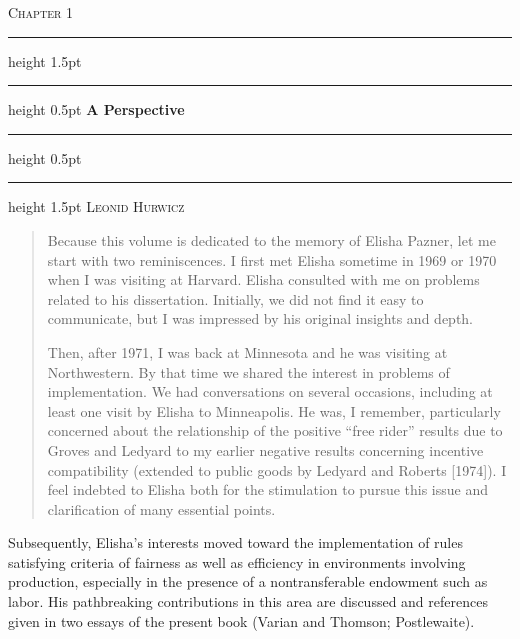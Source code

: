 \documentclass[12pt]{article}
\newenvironment{reminiscence}{%
    \itshape\color{black!80}%
    \begin{quote}%
}{%
    \end{quote}%
}
\begin{document}

\begin{center}
    \vspace*{1cm}
    {\color{SlateGray}\textsc{Chapter 1}} \\
    \vspace{0.4cm}
    \hrule height 1.5pt
    \vspace{0.2cm}
    \hrule height 0.5pt
    \vspace{0.6cm}
    {\huge\bfseries\color{MidnightBlue} A Perspective} \\
    \vspace{0.6cm}
    \hrule height 0.5pt
    \vspace{0.2cm}
    \hrule height 1.5pt
    \vspace{0.8cm}
    {\Large\scshape Leonid Hurwicz} \\
    \vspace{1.5cm}
\end{center}

\begin{reminiscence}
Because this volume is dedicated to the memory of Elisha Pazner, let me start with two reminiscences. I first met Elisha sometime in 1969 or 1970 when I was visiting at Harvard. Elisha consulted with me on problems related to his dissertation. Initially, we did not find it easy to communicate, but I was impressed by his original insights and depth. 

Then, after 1971, I was back at Minnesota and he was visiting at Northwestern. By that time we shared the interest in problems of implementation. We had conversations on several occasions, including at least one visit by Elisha to Minneapolis. He was, I remember, particularly concerned about the relationship of the positive ``free rider'' results due to Groves and Ledyard to my earlier negative results concerning incentive compatibility (extended to public goods by Ledyard and Roberts [1974]). I feel indebted to Elisha both for the stimulation to pursue this issue and clarification of many essential points.
\end{reminiscence}

\medskip

Subsequently, Elisha's interests moved toward the implementation of rules satisfying criteria of fairness as well as efficiency in environments involving production, especially in the presence of a nontransferable endowment such as labor. His pathbreaking contributions in this area are discussed and references given in two essays of the present book (Varian and Thomson; Postlewaite).
\end{document}
